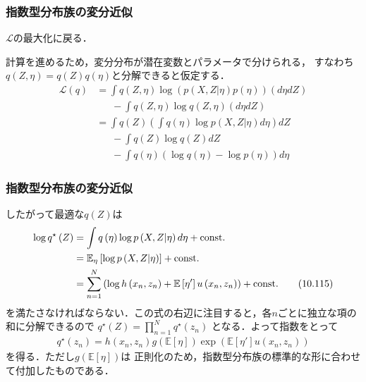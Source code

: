\documentclass[10pt,usepdftitle=false,hyperref={unicode}]{beamer}
\newcommand{\parentheses}[1]{\left(#1\right)}
\newcommand{\brackets}[1]{\left[#1\right]}
\newcommand{\const}{\mathrm{const.}}
\newcommand{\energy}{\mathcal{L}}
\begin{document}
\begin{frame}
\frametitle{指数型分布族の変分近似}
$\energy$の最大化に戻る．

\bigskip

計算を進めるため，変分分布が潜在変数とパラメータで分けられる，
すなわち$q\parentheses{Z, \eta} = q\parentheses{Z}q\parentheses{\eta}$と分解できると仮定する．
\begin{align*}
    \energy\parentheses{q}
    &= \int q\parentheses{Z,\eta} \log \parentheses{%
            p \parentheses{X,Z|\eta}p \parentheses{\eta}
        }\parentheses{d\eta dZ} \\
    &\phantom{=}\ - \int q\parentheses{Z,\eta}\log q\parentheses{Z,\eta}\parentheses{d\eta dZ} \\
    &= \int q\parentheses{Z} \parentheses{%
            \int q\parentheses{\eta} \log p \parentheses{X,Z|\eta}d\eta
        }dZ \\
    &\phantom{=}\ -\int q\parentheses{Z} \log q \parentheses{Z} dZ \\
    &\phantom{=}\ -\int q\parentheses{\eta} \parentheses{\log q \parentheses{\eta} - \log p\parentheses{\eta}}d\eta
\end{align*}
\end{frame}

\begin{frame}
\frametitle{指数型分布族の変分近似}
したがって最適な$q\parentheses{Z}$は
\begin{align}
    \log q^\star\parentheses{Z}
    &= \int q\parentheses{\eta} \log p \parentheses{X,Z|\eta}d\eta + \const \notag \\
    &= \mathbb{E}_\eta \brackets{\log p\parentheses{X,Z|\eta}} + \const \notag \\
    &= \sum_{n = 1}^N \parentheses{\log h\parentheses{x_n, z_n} + \mathbb{E}\brackets{\eta'}u\parentheses{x_n,z_n}} + \const \tag{10.115}
\end{align}
を満たさなければならない．この式の右辺に注目すると，各$n$ごとに独立な項の和に分解できるので
$q^\star\parentheses{Z} = \prod_{n = 1}^N q^\star \parentheses{z_n}$
となる．よって指数をとって
\begin{align*}
    q^\star\parentheses{z_n} = h\parentheses{x_n,z_n}g\parentheses{\mathbb{E}\brackets{\eta}}\exp\parentheses{\mathbb{E}\brackets{\eta'}u\parentheses{x_n,z_n}}
    \tag{10.116}
\end{align*}
を得る．ただし$g\parentheses{\mathbb{E}\brackets{\eta}}$は
正則化のため，指数型分布族の標準的な形に合わせて付加したものである．
\end{frame}
\end{document}
